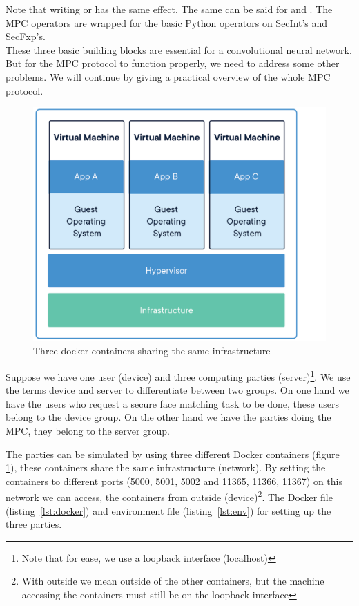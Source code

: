 Note that writing  or  has the same effect. The same can be said for  and . The MPC operators are wrapped for the basic Python operators on SecInt's and SecFxp's.\\

These three basic building blocks are essential for a convolutional neural network. But for the MPC protocol to function properly, we need to address some other problems. We will continue by giving a practical overview of the whole MPC protocol.\\

\begin{figure}[H]
  \includegraphics[scale=0.25]{fig/dockercontainer.png}
  \centering
  \caption{Three docker containers sharing the same infrastructure}
  \label{fig:dockercontainer}
\end{figure}

Suppose we have one user (device) and three computing parties (server)\footnote{Note that for ease, we use a loopback interface (localhost)}. We use the terms device and server to differentiate between two groups. On one hand we have the users who request a secure face matching task to be done, these users belong to the device group. On the other hand we have the parties doing the MPC, they belong to the server group.

The parties can be simulated by using three different Docker containers (figure \ref{fig:dockercontainer}), these containers share the same infrastructure (network). By setting the containers to different ports (5000, 5001, 5002 and 11365, 11366, 11367) on this network we can access, the containers from outside (device)\footnote{With outside we mean outside of the other containers, but the machine accessing the containers must still be on the loopback interface}. The Docker file (listing~\ref{lst:docker}) and environment file (listing~\ref{lst:env}) for  setting up the three parties.

